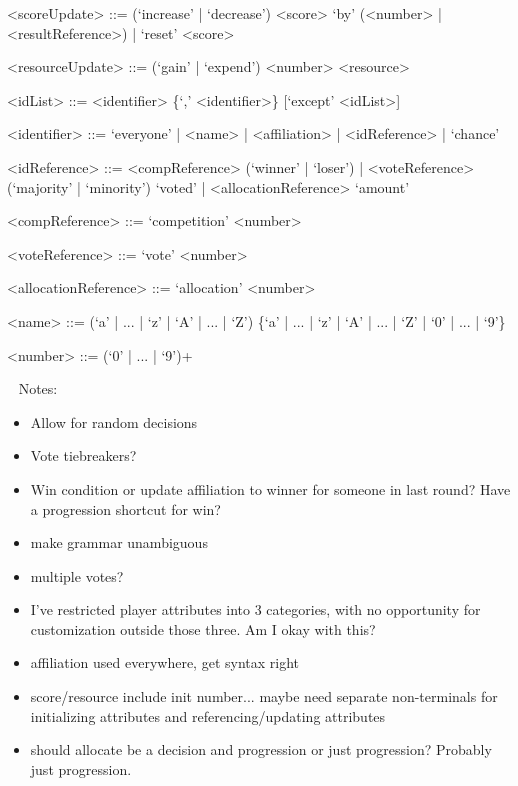 \documentclass{article}
\begin{document}
\begin{grammar}
<scoreUpdate> ::= (`increase' | `decrease') <score> `by' (<number> | 
<resultReference>) | `reset' <score>

<resourceUpdate> ::= (`gain' | `expend') <number> <resource> 

<idList> ::= <identifier> \{`,' <identifier>\} [`except' <idList>]

<identifier> ::= `everyone' | <name> | <affiliation> | <idReference> | `chance' 

<idReference> ::= <compReference> (`winner' | `loser') | <voteReference> 
(`majority' | `minority') `voted' | <allocationReference> `amount'

<compReference> ::= `competition' <number>

<voteReference> ::= `vote' <number>

<allocationReference> ::= `allocation' <number>

<name> ::= (`a' | ... | `z' | `A' | ... | `Z') \{`a' | ... | `z' | `A' | ... | 
`Z' | `0' | ... | `9'\}

<number> ::= (`0' | ... | `9')+

\end{grammar}

~\newline
Notes:
\begin{itemize}
	\item Allow for random decisions
	\item Vote tiebreakers?
	\item Win condition or update affiliation to winner for someone in last 
	round? Have a progression shortcut for win?
	\item make grammar unambiguous
	\item multiple votes? 
	\item I've restricted player attributes into 3 categories, with no 
	opportunity for customization outside those three. Am I okay with this?
	\item affiliation used everywhere, get syntax right
	\item score/resource include init number... maybe need separate 
	non-terminals for initializing attributes and referencing/updating 
	attributes
	\item should allocate be a decision and progression or just progression? 
	Probably just progression.
\end{itemize}
\end{document}
